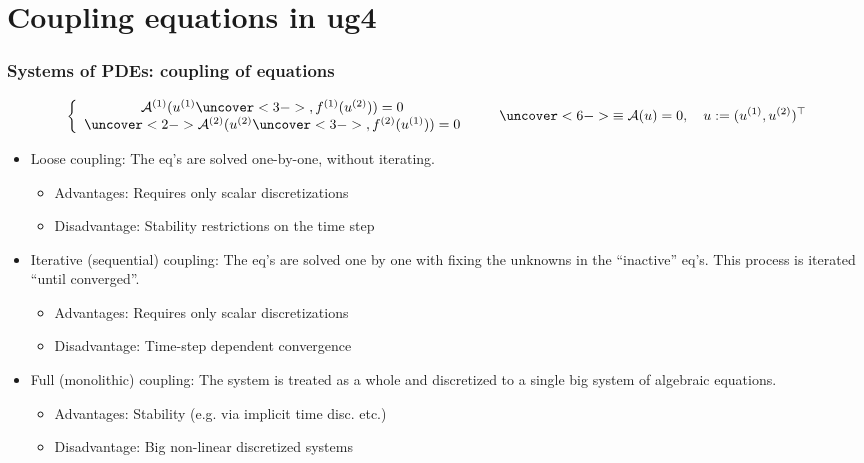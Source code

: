 
\section {Coupling equations in ug4}

\begin {frame} [t]
\frametitle {Systems of PDEs: coupling of equations}
\vspace{-4ex}
$$
	\left \{
	 \begin{array} {c}
	  \mathcal{A}^{(1)} (u^{(1)}\uncover<3->{, f^{(1)} (u^{(2)})}) = 0 \\
	  \uncover<2->{\mathcal{A}^{(2)} (u^{(2)}\uncover<3->{, f^{(2)} (u^{(1)})}) = 0}
	 \end{array}
	\right .
	\qquad
	\uncover<6->
	{
	\equiv
	 \mathcal{A} (u) = 0, \quad u := (u^{(1)}, u^{(2)})^{\top}
	}
$$

\vspace{-2ex}
\begin {itemize}
\item<4-> {\color{blue} Loose coupling}: The eq's are solved one-by-one, without iterating.
	\begin {itemize}
		\item Advantages: Requires only scalar discretizations
		\item Disadvantage: Stability restrictions on the time step
	\end {itemize}
\item<5-> {\color{blue} Iterative (sequential) coupling}: The eq's are
	solved one by one with fixing the unknowns in the ``inactive'' eq's. This
	process is iterated ``until converged''.
	\begin {itemize}
		\item Advantages: Requires only scalar discretizations
		\item Disadvantage: Time-step dependent convergence
	\end {itemize}
\item<6-> {\color{blue} Full (monolithic) coupling}: The system is treated as a whole and discretized to
	a single big system of algebraic equations.
	\begin {itemize}
		\item Advantages: Stability (e.g. via implicit time disc. etc.)
		\item Disadvantage: Big non-linear discretized systems 
	\end {itemize}
\end {itemize}
\end {frame}

